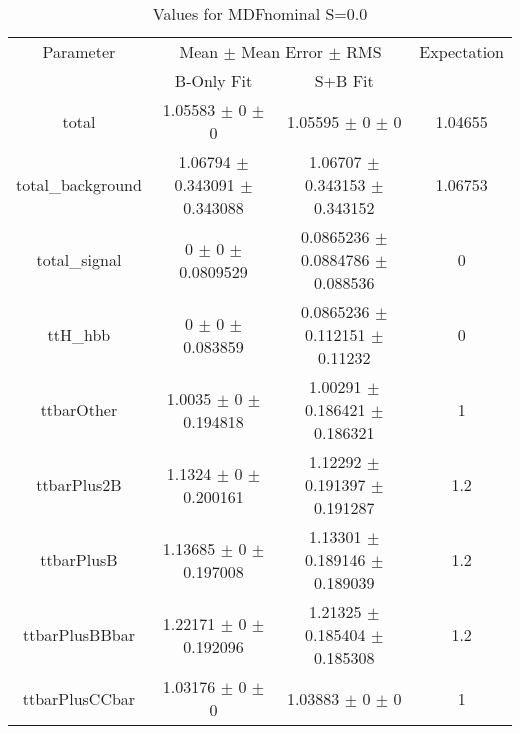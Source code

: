 \begin{table}
\centering
\caption{Values for MDFnominal S=0.0}
\begin{tabular}{cccc}
\toprule
Parameter & \multicolumn{2}{c}{Mean $\pm$ Mean Error $\pm$ RMS} & Expectation\\
 & B-Only Fit & S+B Fit & \\
\midrule
total & \num{1.05583} $\pm$ \num{0} $\pm$ \num{0} & \num{1.05595} $\pm$ \num{0} $\pm$ \num{0} & \num{1.04655}\\
total\_background & \num{1.06794} $\pm$ \num{0.343091} $\pm$ \num{0.343088} & \num{1.06707} $\pm$ \num{0.343153} $\pm$ \num{0.343152} & \num{1.06753}\\
total\_signal & \num{0} $\pm$ \num{0} $\pm$ \num{0.0809529} & \num{0.0865236} $\pm$ \num{0.0884786} $\pm$ \num{0.088536} & \num{0}\\
ttH\_hbb & \num{0} $\pm$ \num{0} $\pm$ \num{0.083859} & \num{0.0865236} $\pm$ \num{0.112151} $\pm$ \num{0.11232} & \num{0}\\
ttbarOther & \num{1.0035} $\pm$ \num{0} $\pm$ \num{0.194818} & \num{1.00291} $\pm$ \num{0.186421} $\pm$ \num{0.186321} & \num{1}\\
ttbarPlus2B & \num{1.1324} $\pm$ \num{0} $\pm$ \num{0.200161} & \num{1.12292} $\pm$ \num{0.191397} $\pm$ \num{0.191287} & \num{1.2}\\
ttbarPlusB & \num{1.13685} $\pm$ \num{0} $\pm$ \num{0.197008} & \num{1.13301} $\pm$ \num{0.189146} $\pm$ \num{0.189039} & \num{1.2}\\
ttbarPlusBBbar & \num{1.22171} $\pm$ \num{0} $\pm$ \num{0.192096} & \num{1.21325} $\pm$ \num{0.185404} $\pm$ \num{0.185308} & \num{1.2}\\
ttbarPlusCCbar & \num{1.03176} $\pm$ \num{0} $\pm$ \num{0} & \num{1.03883} $\pm$ \num{0} $\pm$ \num{0} & \num{1}\\
\bottomrule
\end{tabular}
\end{table}